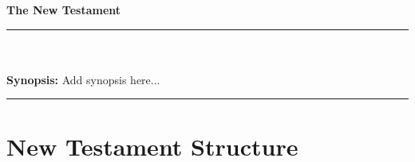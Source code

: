 \newpage
\thispagestyle{empty}

\begin{center}
\vspace{5cm}
\Huge \textbf{The New Testament}
\end{center}

\rule{\textwidth}{0.5pt}\\  %
\vspace{-.4em} \\
\small \textbf{Synopsis:} Add synopsis here... \\
\rule{\textwidth}{0.5pt}    %

\section*{New Testament Structure}

